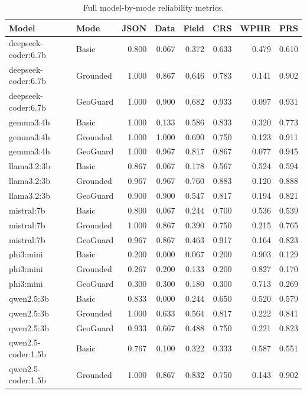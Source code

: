 \documentclass[12pt]{gsis}  %
\begin{document}
\begin{table}[htbp]
\centering
\caption{Full model-by-mode reliability metrics.}
\label{tab:model-mode-full}
\small
\setlength{\tabcolsep}{3pt}
\begin{tabular}{llrrrrrr}
\toprule
Model & Mode & JSON & Data & Field & CRS & WPHR & PRS \\
\midrule
deepseek-coder:6.7b & Basic & 0.800 & 0.067 & 0.372 & 0.633 & 0.479 & 0.610 \\
deepseek-coder:6.7b & Grounded & 1.000 & 0.867 & 0.646 & 0.783 & 0.141 & 0.902 \\
deepseek-coder:6.7b & GeoGuard & 1.000 & 0.900 & 0.682 & 0.933 & 0.097 & 0.931 \\
gemma3:4b & Basic & 1.000 & 0.133 & 0.586 & 0.833 & 0.320 & 0.773 \\
gemma3:4b & Grounded & 1.000 & 1.000 & 0.690 & 0.750 & 0.123 & 0.911 \\
gemma3:4b & GeoGuard & 1.000 & 0.967 & 0.817 & 0.867 & 0.077 & 0.945 \\
llama3.2:3b & Basic & 0.867 & 0.067 & 0.178 & 0.567 & 0.524 & 0.594 \\
llama3.2:3b & Grounded & 0.967 & 0.967 & 0.760 & 0.883 & 0.120 & 0.888 \\
llama3.2:3b & GeoGuard & 0.900 & 0.900 & 0.547 & 0.817 & 0.194 & 0.821 \\
mistral:7b & Basic & 0.800 & 0.067 & 0.244 & 0.700 & 0.536 & 0.539 \\
mistral:7b & Grounded & 1.000 & 0.867 & 0.390 & 0.750 & 0.215 & 0.765 \\
mistral:7b & GeoGuard & 0.967 & 0.867 & 0.463 & 0.917 & 0.164 & 0.823 \\
phi3:mini & Basic & 0.200 & 0.000 & 0.067 & 0.200 & 0.903 & 0.129 \\
phi3:mini & Grounded & 0.267 & 0.200 & 0.133 & 0.200 & 0.827 & 0.170 \\
phi3:mini & GeoGuard & 0.300 & 0.300 & 0.180 & 0.300 & 0.713 & 0.269 \\
qwen2.5:3b & Basic & 0.833 & 0.000 & 0.244 & 0.650 & 0.520 & 0.579 \\
qwen2.5:3b & Grounded & 1.000 & 0.633 & 0.564 & 0.817 & 0.222 & 0.841 \\
qwen2.5:3b & GeoGuard & 0.933 & 0.667 & 0.488 & 0.750 & 0.221 & 0.823 \\
qwen2.5-coder:1.5b & Basic & 0.767 & 0.100 & 0.322 & 0.333 & 0.587 & 0.551 \\
qwen2.5-coder:1.5b & Grounded & 1.000 & 0.867 & 0.832 & 0.750 & 0.143 & 0.902 \\

\end{tabular}
\end{table}
\end{document}
